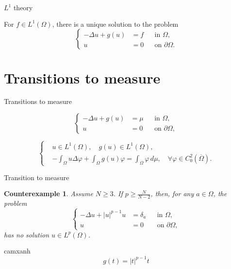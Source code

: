 \documentclass{beamer}
\begin{document}
\begin{frame}{$L^1$ theory}
\begin{theorem}
For $f \in L^1(\Omega)$, there is a unique solution to the problem
\[
\left\{
\begin{aligned}
-\Delta u + g(u) & = f && \text{in } \Omega , \\
u & = 0 && \text{on } \partial \Omega .
\end{aligned}
\right.
\]
\end{theorem}
\end{frame}

\section{Transitions to measure}

\begin{frame}{Transitions to measure}
\begin{pro}
\[
\left\{
\begin{aligned}
-\Delta u + g(u) & = \mu && \text{in } \Omega , \\
u & = 0 && \text{on } \partial \Omega ,
\end{aligned}
\right.
\]
\end{pro}
\bigskip
\begin{weak}
\[
\left\{
\begin{aligned}
& u \in L^1(\Omega ),\quad g(u) \in L^1(\Omega ) ,\\
&-\int_{\Omega} u \Delta \varphi + \int_{\Omega} g(u)\varphi = \int_{\Omega}\varphi\,d\mu, \quad \forall \varphi \in C^2_0(\overline{\Omega}) .
\end{aligned}
\right.
\]
\end{weak}
\end{frame}

\begin{frame}{Transition to measure}
\newtheorem*{cou}{Counterexample}
\begin{cou}
Assume $N\ge 3$. If $p \ge \frac{N}{N-2}$, then, for any $a\in \Omega$, the problem
\[
\left\{
\begin{aligned}
-\Delta u + |u|^{p-1}u & = \delta_a && \text{in } \Omega , \\
u & = 0 && \text{on } \partial \Omega ,
\end{aligned}
\right.
\]
has no solution $u\in L^p(\Omega)$.
\end{cou}
\bigskip
\begin{beamercolorbox}{camxanh}
\[
g(t) = |t|^{p-1}t
\]
\end{beamercolorbox}
\end{frame}
\end{document}
